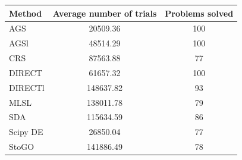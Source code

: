 \documentclass[a4paper]{article}
\begin{document}
\begin{tabular}{lcc}
\hline
 Method   &  Average number of trials  &  Problems solved  \\
\hline
 AGS      &          20509.36          &        100        \\
 AGSl     &          48514.29          &        100        \\
 CRS      &          87563.88          &        77         \\
 DIRECT   &          61657.32          &        100        \\
 DIRECTl  &         148637.82          &        93         \\
 MLSL     &         138011.78          &        79         \\
 SDA      &         115634.59          &        86         \\
 Scipy DE &          26850.04          &        77         \\
 StoGO    &         141886.49          &        78         \\
\hline
\end{tabular}
\end{document}
